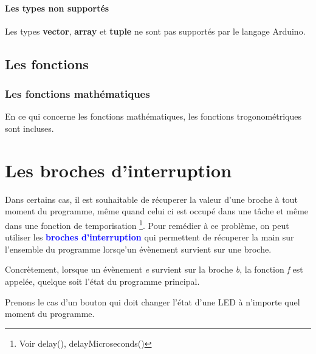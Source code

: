 \subsubsection {Les types non supportés}

Les types \textbf{vector}, \textbf{array} et \textbf{tuple} ne sont pas supportés par le langage Arduino.




\section{Les fonctions}

\subsection{Les fonctions mathématiques}

En ce qui concerne les fonctions mathématiques, les fonctions trogonométriques sont incluses.



\chapter{Les broches d'interruption}

Dans certains cas, il est souhaitable de récuperer la valeur d'une broche à tout moment du programme, même quand celui ci est occupé dans une tâche et même dans une fonction de temporisation \footnote{Voir delay(), delayMicroseconds()}. \newline
Pour remédier à ce problème, on peut utiliser les \textcolor{blue} {\textbf{broches d'interruption}} qui permettent de récuperer la main sur l'ensemble du programme lorsqe'un évènement survient sur une broche.\newline

Concrètement, lorsque un évènement  \emph{e} survient sur la broche \emph{b}, la fonction \emph{f} est appelée, quelque soit l'état du programme principal. \newline


Prenons le cas d'un bouton qui doit changer l'état d'une LED à n'importe quel moment du programme.


